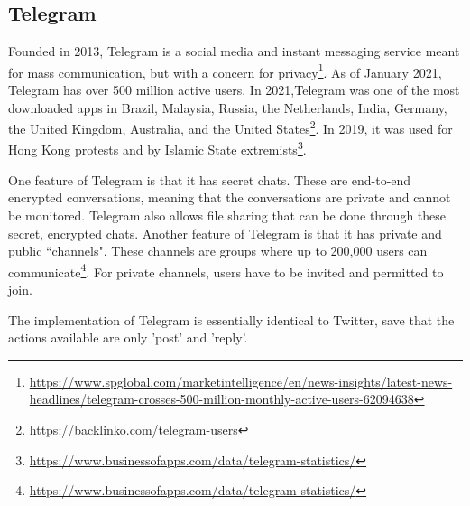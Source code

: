 \subsection{Telegram}
Founded in 2013, Telegram is a social media and instant messaging service meant for mass communication, but with a concern for privacy\footnote{\href{https://www.spglobal.com/marketintelligence/en/news-insights/latest-news-headlines/telegram-crosses-500-million-monthly-active-users-62094638}{https://www.spglobal.com/marketintelligence/en/news-insights/latest-news-headlines/telegram-crosses-500-million-monthly-active-users-62094638}}. 
As of January 2021, Telegram has over 500 million active users.
In 2021,Telegram was one of the most downloaded apps in Brazil, Malaysia, Russia, the Netherlands, India, Germany, the United Kingdom, Australia, and the United States\footnote{\href{https://backlinko.com/telegram-users}{https://backlinko.com/telegram-users}}.
In 2019, it was used for Hong Kong protests and by Islamic State extremists\footnote{\href{https://www.businessofapps.com/data/telegram-statistics/}{https://www.businessofapps.com/data/telegram-statistics/}}.
 \par One feature of Telegram is that it has secret chats. These are end-to-end encrypted conversations, meaning that the conversations are private and cannot be monitored. Telegram also allows file sharing that can be done through these secret, encrypted chats.
Another feature of Telegram is that it has private and public ``channels". These channels are groups where up to 200,000 users can communicate\footnote{\href{https://www.vox.com/recode/22238755/telegram-messaging-social-media-extremists}{https://www.businessofapps.com/data/telegram-statistics/}}. For private channels, users have to be invited and permitted to join.
 
The \rhpc implementation of Telegram is essentially identical to Twitter, save that the actions available are only 'post' and 'reply'.

